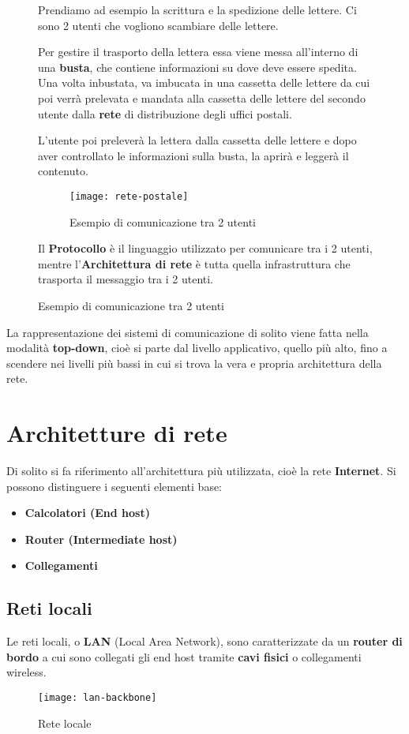 \documentclass[a4paper]{article}
\begin{document}
\begin{figure}[H]
  \begin{example}
    Prendiamo ad esempio la scrittura e la spedizione delle lettere. Ci sono 2
    utenti che vogliono scambiare delle lettere.
    
    Per gestire il trasporto della
    lettera essa viene messa all'interno di una \textbf{busta}, che contiene informazioni
    su dove deve essere spedita. Una volta inbustata, va imbucata in una cassetta 
    delle lettere da cui poi verrà prelevata e mandata alla cassetta delle lettere 
    del secondo utente dalla \textbf{rete} di distribuzione degli uffici postali.

    L'utente poi preleverà la lettera dalla cassetta delle lettere e dopo aver
    controllato le informazioni sulla busta, la aprirà e leggerà il contenuto.
    \begin{figure}[H]
      \centering
      \texttt{[image: rete-postale]}
      \caption{Esempio di comunicazione tra 2 utenti}
    \end{figure}

    Il \textbf{Protocollo} è il linguaggio utilizzato per comunicare tra i 2
    utenti, mentre l'\textbf{Architettura di rete} è tutta quella infrastruttura
    che trasporta il messaggio tra i 2 utenti.
  \end{example}
\end{figure}

\noindent
La rappresentazione dei sistemi di comunicazione di solito viene fatta nella modalità
\textbf{top-down}, cioè si parte dal livello applicativo, quello più alto, fino a scendere
nei livelli più bassi in cui si trova la vera e propria architettura della rete.

\section{Architetture di rete}
Di solito si fa riferimento all'architettura più utilizzata, cioè la rete
\textbf{Internet}. Si possono distinguere i seguenti elementi base:
\begin{itemize}
  \item \textbf{Calcolatori (End host)}
  \item \textbf{Router (Intermediate host)}
  \item \textbf{Collegamenti}
\end{itemize}

\subsection{Reti locali}
Le reti locali, o \textbf{LAN} (Local Area Network), sono caratterizzate da un
\textbf{router di bordo} a cui sono collegati gli end host tramite \textbf{cavi fisici}
o collegamenti wireless.
\begin{figure}[H]
  \centering
  \texttt{[image: lan-backbone]}
  \caption{Rete locale}
\end{figure}
\end{document}
